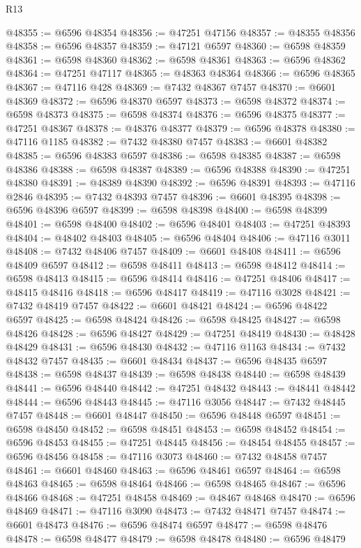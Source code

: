 \begin{lexlean}{R13}
\begin{coremodule}
@48355 := @6596 @48354
@48356 := @47251 @47156
@48357 := @48355 @48356
@48358 := @6596 @48357
@48359 := @47121 @6597
@48360 := @6598 @48359
@48361 := @6598 @48360
@48362 := @6598 @48361
@48363 := @6596 @48362
@48364 := @47251 @47117
@48365 := @48363 @48364
@48366 := @6596 @48365
@48367 := @47116 @428
@48369 := @7432 @48367 @7457
@48370 := @6601 @48369
@48372 := @6596 @48370 @6597
@48373 := @6598 @48372
@48374 := @6598 @48373
@48375 := @6598 @48374
@48376 := @6596 @48375
@48377 := @47251 @48367
@48378 := @48376 @48377
@48379 := @6596 @48378
@48380 := @47116 @1185
@48382 := @7432 @48380 @7457
@48383 := @6601 @48382
@48385 := @6596 @48383 @6597
@48386 := @6598 @48385
@48387 := @6598 @48386
@48388 := @6598 @48387
@48389 := @6596 @48388
@48390 := @47251 @48380
@48391 := @48389 @48390
@48392 := @6596 @48391
@48393 := @47116 @2846
@48395 := @7432 @48393 @7457
@48396 := @6601 @48395
@48398 := @6596 @48396 @6597
@48399 := @6598 @48398
@48400 := @6598 @48399
@48401 := @6598 @48400
@48402 := @6596 @48401
@48403 := @47251 @48393
@48404 := @48402 @48403
@48405 := @6596 @48404
@48406 := @47116 @3011
@48408 := @7432 @48406 @7457
@48409 := @6601 @48408
@48411 := @6596 @48409 @6597
@48412 := @6598 @48411
@48413 := @6598 @48412
@48414 := @6598 @48413
@48415 := @6596 @48414
@48416 := @47251 @48406
@48417 := @48415 @48416
@48418 := @6596 @48417
@48419 := @47116 @3028
@48421 := @7432 @48419 @7457
@48422 := @6601 @48421
@48424 := @6596 @48422 @6597
@48425 := @6598 @48424
@48426 := @6598 @48425
@48427 := @6598 @48426
@48428 := @6596 @48427
@48429 := @47251 @48419
@48430 := @48428 @48429
@48431 := @6596 @48430
@48432 := @47116 @1163
@48434 := @7432 @48432 @7457
@48435 := @6601 @48434
@48437 := @6596 @48435 @6597
@48438 := @6598 @48437
@48439 := @6598 @48438
@48440 := @6598 @48439
@48441 := @6596 @48440
@48442 := @47251 @48432
@48443 := @48441 @48442
@48444 := @6596 @48443
@48445 := @47116 @3056
@48447 := @7432 @48445 @7457
@48448 := @6601 @48447
@48450 := @6596 @48448 @6597
@48451 := @6598 @48450
@48452 := @6598 @48451
@48453 := @6598 @48452
@48454 := @6596 @48453
@48455 := @47251 @48445
@48456 := @48454 @48455
@48457 := @6596 @48456
@48458 := @47116 @3073
@48460 := @7432 @48458 @7457
@48461 := @6601 @48460
@48463 := @6596 @48461 @6597
@48464 := @6598 @48463
@48465 := @6598 @48464
@48466 := @6598 @48465
@48467 := @6596 @48466
@48468 := @47251 @48458
@48469 := @48467 @48468
@48470 := @6596 @48469
@48471 := @47116 @3090
@48473 := @7432 @48471 @7457
@48474 := @6601 @48473
@48476 := @6596 @48474 @6597
@48477 := @6598 @48476
@48478 := @6598 @48477
@48479 := @6598 @48478
@48480 := @6596 @48479

\end{coremodule}
\end{lexlean}
